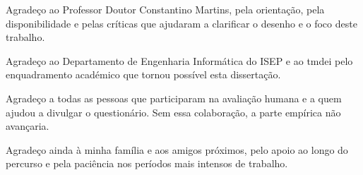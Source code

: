 \begin{acknowledgements}

Agradeço ao Professor Doutor Constantino Martins, pela orientação, pela disponibilidade e pelas críticas que ajudaram a clarificar o desenho e o foco deste trabalho.

Agradeço ao Departamento de Engenharia Informática do ISEP e ao \gls{tmdei} pelo enquadramento académico que tornou possível esta dissertação.

Agradeço a todas as pessoas que participaram na avaliação humana e a quem ajudou a divulgar o questionário. Sem essa colaboração, a parte empírica não avançaria.

Agradeço ainda à minha família e aos amigos próximos, pelo apoio ao longo do percurso e pela paciência nos períodos mais intensos de trabalho.

\end{acknowledgements}


\tableofcontents %

\listoffigures %

\listoftables %

\cleardoublepage
\chapter*{\listalgorithmname}
\makeatletter
{}
\makeatother






